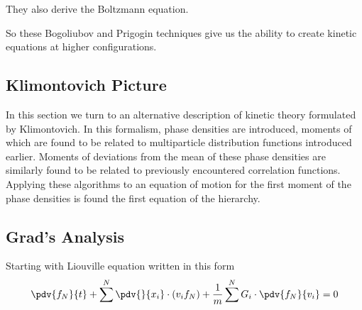 They also derive the Boltzmann equation.

So these Bogoliubov and Prigogin techniques give us the ability to create kinetic equations at higher configurations.

\subsection{Klimontovich Picture}

In this section we turn to an alternative description of kinetic theory formulated by Klimontovich. In this formalism, phase densities are introduced, moments of which are found to be related to multiparticle distribution functions introduced earlier. Moments of deviations from the mean of these phase densities are similarly found to be related to previously encountered correlation functions. Applying these algorithms to an equation of motion for the first moment of the phase densities is found the first equation of the hierarchy.

\subsection{Grad's Analysis}

Starting with Liouville equation written in this form
\[
\pdv{f_N}{t} + \sum^N \pdv{}{x_i} \cdot (v_i f_N) + \frac{1}{m} \sum^N G_i \cdot \pdv{f_N}{v_i} = 0
  \]
